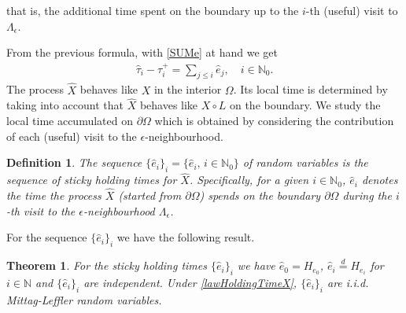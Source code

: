 \documentclass[11pt,a4paper]{article}
\newtheorem{theorem}{Theorem}[section]
\newtheorem{definition}{Definition}
\newcommand{\magenta}{black}
\begin{document}
that is, the additional time spent on the boundary up to the $i$-th (useful) visit to $\Lambda_\epsilon$. {\color{\magenta} From the previous formula, with \eqref{SUMe} at hand we get
\begin{align}
\hat{\tau}_i - \tau^+_i = \sum_{j \leq i} \hat{e}_j, \quad i \in \mathbb{N}_0.
\label{SUMehat}
\end{align}
The process $\hat{X}$ behaves like $X$ in the interior $\Omega$. Its local time is determined by taking into account that $\hat{X}$ behaves like $X\circ L$ on the boundary. We study the local time accumulated on $\partial \Omega$ which is obtained by considering the contribution of each (useful) visit to the $\epsilon$-neighbourhood. 


\begin{definition}
The sequence $\{\hat{e}_i\}_i = \{\hat{e}_i,\, i \in \mathbb{N}_0\}$ of random variables is the sequence of sticky holding times for $\hat{X}$. Specifically, for a given $i \in \mathbb{N}_0$, $\hat{e}_i$ denotes the time the process $\hat{X}$ (started from $\partial \Omega$) spends on the boundary $\partial \Omega$ during the $i$-th visit to the $\epsilon$-neighbourhood $\Lambda_\epsilon$. 
\label{def:HTXhat}
\end{definition}


For the sequence $\{\hat{e}_i\}_i$ we have the following result.

\begin{theorem}
\label{thm:ehatHe}
For the sticky holding times $\{\hat{e}_i\}_i$ we have $\hat{e}_0 = H_{e_0}$, $\hat{e}_i \stackrel{d}{=} H_{e_i}$ for $i \in \mathbb{N}$ and $\{\hat{e}_i\}_i$ are independent. Under \eqref{lawHoldingTimeX}, $\{\hat{e}_i\}_i$ are i.i.d. Mittag-Leffler random variables.
\end{theorem}
}
\end{document}
